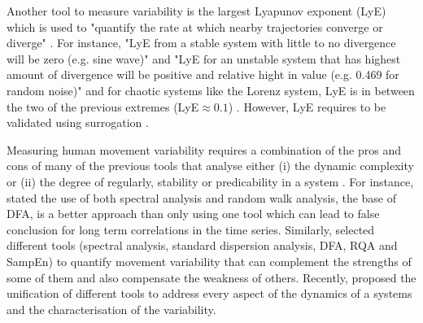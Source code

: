 %
%
%
%


Another tool to measure variability is the largest Lyapunov exponent (LyE) 
which is used to "quantify the rate at which nearby trajectories
converge or diverge" \citep[p. 85]{stergiou2016b}.
For instance, "LyE from a stable system with little to no divergence will 
be zero (e.g. sine wave)" and "LyE for an unstable system that has highest 
amount of divergence will be positive and relative hight in value
(e.g. 0.469 for random noise)" and for chaotic systems like the Lorenz system,
LyE is in between the two of the previous extremes (LyE$\approx0.1$) 
\cite[p. 2874]{miller2006}. However,  LyE requires to be validated using 
surrogation \citep{dingwell2000, miller2006}.



Measuring human movement variability requires a combination of the 
pros and cons of many of the previous tools that analyse either 
(i) the dynamic complexity or (ii) the degree of regularly, stability or 
predicability in a system \citep{goldberger2002b, harbourne2009, stergiou2011}.
For instance, \cite{rangarajan2000} stated the use of both spectral analysis 
and random walk analysis, the base of DFA, is a better approach than only 
using one tool which can lead to false conclusion for long term correlations
in the time series.
Similarly, \cite{wijnants2009} selected different tools (spectral analysis, 
standard dispersion analysis, DFA, RQA and SampEn) to quantify movement 
variability that can complement the strengths of some of them and also 
compensate the weakness of others. Recently, \cite{caballero2014} proposed 
the unification of different tools to address every aspect of the dynamics 
of a systems and the characterisation of the variability. 

